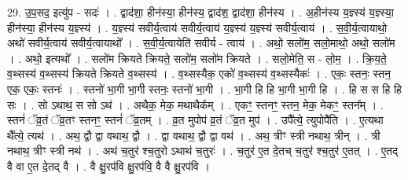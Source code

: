 \documentclass[17pt]{extarticle}
\begin{document}
29. उ॒प॒सद॒ इत्यु॑प - सदः॑ । . द्वाद॑शा॒ हीन॑स्या॒ हीन॑स्य॒ द्वाद॑श॒ द्वाद॑शा॒ हीन॑स्य । . अ॒हीन॑स्य य॒ज्ञ्स्य॑ य॒ज्ञ्स्या॒ हीन॑स्या॒ हीन॑स्य य॒ज्ञ्स्य॑ । . य॒ज्ञ्स्य॑ सवीर्य॒त्वाय॑ सवीर्य॒त्वाय॑ य॒ज्ञ्स्य॑ य॒ज्ञ्स्य॑ सवीर्य॒त्वाय॑ । . स॒वी॒र्य॒त्वायाथो॒ अथो॑ सवीर्य॒त्वाय॑ सवीर्य॒त्वायाथो᳚ । . स॒वी॒र्य॒त्वायेति॑ सवीर्य - त्वाय॑ । . अथो॒ सलो॑म॒ सलो॒माथो॒ अथो॒ सलो॑म । . अथो॒ इत्यथो᳚ । . सलो॑म क्रियते क्रियते॒ सलो॑म॒ सलो॑म क्रियते । . सलो॒मेति॒ स - लो॒म॒ । . क्रि॒य॒ते॒ व॒थ्सस्य॑ व॒थ्सस्य॑ क्रियते क्रियते व॒थ्सस्य॑ । . व॒थ्सस्यैक॒ एको॑ व॒थ्सस्य॑ व॒थ्सस्यैकः॑ । . एकः॒ स्तनः॒ स्तन॒ एक॒ एकः॒ स्तनः॑ । . स्तनो॑ भा॒गी भा॒गी स्तनः॒ स्तनो॑ भा॒गी । . भा॒गी हि हि भा॒गी भा॒गी हि । . हि स स हि हि सः । . सो ऽथाथ॒ स सो ऽथ॑ । . अथैक॒ मेक॒ मथाथैक᳚म् । . एकꣳ॒॒ स्तनꣳ॒॒ स्तन॒ मेक॒ मेकꣳ॒॒ स्तन᳚म् । . स्तनं॑ ॅव्र॒तं ॅव्र॒तꣳ स्तनꣳ॒॒ स्तनं॑ ॅव्र॒तम् । . व्र॒त मुपोप॑ व्र॒तं ॅव्र॒त मुप॑ । . उपै᳚त्ये॒ त्युपोपै॑ति । . ए॒त्यथा थै᳚त्ये॒ त्यथ॑ । . अथ॒ द्वौ द्वा वथाथ॒ द्वौ । . द्वा वथाथ॒ द्वौ द्वा वथ॑ । . अथ॒ त्रीꣳ स्त्री नथाथ॒ त्रीन् । . त्री नथाथ॒ त्रीꣳ स्त्री नथ॑ । . अथ॑ च॒तुर॑ श्च॒तुरो ऽथाथ॑ च॒तुरः॑ । . च॒तुर॑ ए॒त दे॒तच् च॒तुर॑ श्च॒तुर॑ ए॒तत् । . ए॒तद् वै वा ए॒त दे॒तद् वै । . वै क्षु॒रप॑वि क्षु॒रप॑वि॒ वै वै क्षु॒रप॑वि । \newline
\end{document}
